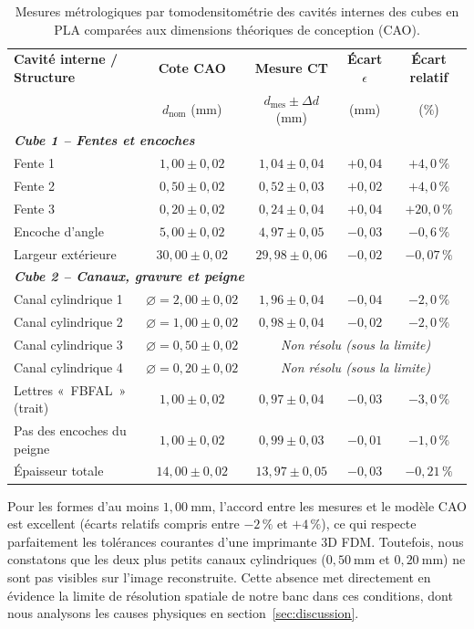 \begin{table}[htbp]
\centering
\small
\setlength{\tabcolsep}{4.0pt}
\caption{Mesures métrologiques par tomodensitométrie des cavités internes des cubes en PLA comparées aux dimensions théoriques de conception (CAO).}
\label{tab:resultats_cubes_metrologie}
\begin{tabular}{lcccc}
\toprule
\textbf{Cavité interne / Structure} & \textbf{Cote CAO} & \textbf{Mesure CT} & \textbf{Écart} $\epsilon$ & \textbf{Écart relatif} \\
& $d_{\text{nom}}$ (mm) & $d_{\text{mes}} \pm \Delta d$ (mm) & ($\text{mm}$) & ($\%$) \\
\midrule
\multicolumn{5}{l}{\textit{\textbf{Cube 1 -- Fentes et encoches}}} \\
Fente 1 & $1{,}00 \pm 0{,}02$ & $1{,}04 \pm 0{,}04$ & $+0{,}04$ & $+4{,}0\,\%$ \\
Fente 2 & $0{,}50 \pm 0{,}02$ & $0{,}52 \pm 0{,}03$ & $+0{,}02$ & $+4{,}0\,\%$ \\
Fente 3 & $0{,}20 \pm 0{,}02$ & $0{,}24 \pm 0{,}04$ & $+0{,}04$ & $+20{,}0\,\%$ \\
Encoche d'angle & $5{,}00 \pm 0{,}02$ & $4{,}97 \pm 0{,}05$ & $-0{,}03$ & $-0{,}6\,\%$ \\
Largeur extérieure & $30{,}00 \pm 0{,}02$ & $29{,}98 \pm 0{,}06$ & $-0{,}02$ & $-0{,}07\,\%$ \\
\midrule
\multicolumn{5}{l}{\textit{\textbf{Cube 2 -- Canaux, gravure et peigne}}} \\
Canal cylindrique 1 & $\varnothing = 2{,}00 \pm 0{,}02$ & $1{,}96 \pm 0{,}04$ & $-0{,}04$ & $-2{,}0\,\%$ \\
Canal cylindrique 2 & $\varnothing = 1{,}00 \pm 0{,}02$ & $0{,}98 \pm 0{,}04$ & $-0{,}02$ & $-2{,}0\,\%$ \\
Canal cylindrique 3 & $\varnothing = 0{,}50 \pm 0{,}02$ & \multicolumn{3}{c}{\textit{Non résolu (sous la limite)}} \\
Canal cylindrique 4 & $\varnothing = 0{,}20 \pm 0{,}02$ & \multicolumn{3}{c}{\textit{Non résolu (sous la limite)}} \\
Lettres «~FBFAL~» (trait) & $1{,}00 \pm 0{,}02$ & $0{,}97 \pm 0{,}04$ & $-0{,}03$ & $-3{,}0\,\%$ \\
Pas des encoches du peigne & $1{,}00 \pm 0{,}02$ & $0{,}99 \pm 0{,}03$ & $-0{,}01$ & $-1{,}0\,\%$ \\
Épaisseur totale & $14{,}00 \pm 0{,}02$ & $13{,}97 \pm 0{,}05$ & $-0{,}03$ & $-0{,}21\,\%$ \\
\bottomrule
\end{tabular}
\end{table}

Pour les formes d'au moins $1{,}00~\text{mm}$, l'accord entre les mesures et le modèle CAO est excellent (écarts relatifs compris entre $-2\,\%$ et $+4\,\%$), ce qui respecte parfaitement les tolérances courantes d'une imprimante 3D FDM. Toutefois, nous constatons que les deux plus petits canaux cylindriques ($0{,}50~\text{mm}$ et $0{,}20~\text{mm}$) ne sont pas visibles sur l'image reconstruite. Cette absence met directement en évidence la limite de résolution spatiale de notre banc dans ces conditions, dont nous analysons les causes physiques en section~\ref{sec:discussion}.
